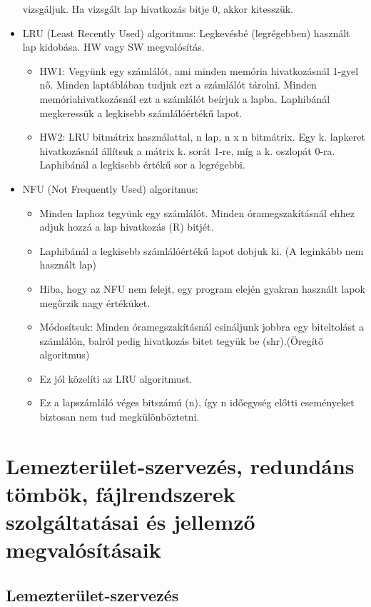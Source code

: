 \documentclass[margin=0px]{article}
\begin{document}
\begin{itemize}
		vizsgáljuk. Ha vizsgált lap hivatkozás bitje 0, akkor kitesszük.
		\item LRU (Least Recently Used) algoritmus: Legkevésbé (legrégebben) használt lap kidobása. HW vagy SW megvalósítás.
		\begin{itemize}
			\item HW1: Vegyünk egy számlálót, ami minden memória hivatkozásnál 1-gyel nő. Minden laptáblában tudjuk ezt a számlálót tárolni. Minden memóriahivatkozásnál ezt a számlálót beírjuk a lapba. Laphibánál megkeressük a legkisebb számlálóértékű lapot.
			\item HW2: LRU bitmátrix használattal, n lap, n x n bitmátrix. Egy k. lapkeret hivatkozásnál állítsuk a mátrix k. sorát 1-re, míg a k. oszlopát 0-ra. Laphibánál a legkisebb értékű sor a legrégebbi.
		\end{itemize}
		\item NFU (Not Frequently Used) algoritmus:
		\begin{itemize}
			\item Minden laphoz tegyünk egy számlálót. Minden óramegszakításnál ehhez adjuk hozzá a lap
			hivatkozás (R) bitjét.
			\item Laphibánál a legkisebb számlálóértékű lapot dobjuk ki. (A leginkább nem használt lap)
			\item Hiba, hogy az NFU nem felejt, egy program elején gyakran használt lapok megőrzik nagy értéküket.
			\item Módosítsuk: Minden óramegszakításnál csináljunk jobbra egy biteltolást a számlálón, balról pedig hivatkozás bitet tegyük be (shr).(Öregítő algoritmus)
			\item Ez jól közelíti az LRU algoritmust.
			\item Ez a lapszámláló véges bitszámú (n), így n időegység előtti eseményeket biztosan nem tud megkülönböztetni.
		\end{itemize}
	\end{itemize}
	
	\section{Lemezterület-szervezés, redundáns tömbök, fájlrendszerek szolgáltatásai és jellemző megvalósításaik}
	
	\subsection{Lemezterület-szervezés}
	
\end{document}
